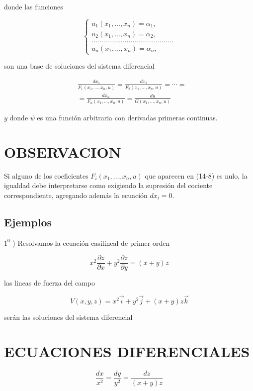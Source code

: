 \documentclass[10pt]{article}
\theoremstyle{plain}
\theoremstyle{definition}
\theoremstyle{remark}
\begin{document}
donde las funciones


$$
\left\{\begin{array}{l}
u_{1}\left(x_{1}, \ldots, x_{n}\right)=\alpha_{1}, \\
u_{2}\left(x_{1}, \ldots, x_{n}\right)=\alpha_{2}, \\
\ldots \ldots \ldots \ldots \ldots \ldots \ldots \ldots \ldots \ldots \ldots \ldots \ldots \ldots \\
u_{n}\left(x_{1}, \ldots, x_{n}\right)=\alpha_{n},
\end{array}\right.
$$

son una base de soluciones del sistema diferencial


\begin{align*}
& \frac{d x_{1}}{F_{1}\left(x_{1}, \ldots, x_{n}, u\right)}=\frac{d x_{2}}{F_{2}\left(x_{1}, \ldots, x_{n}, u\right)}=\cdots= \\
& =\frac{d x_{n}}{F_{n}\left(x_{1}, \ldots, x_{n}, u\right)}=\frac{d u}{G\left(x_{1}, \ldots, x_{n}, u\right)} \tag{14-8}
\end{align*}


$y$ donde $\psi$ es una función arbitraria con derivadas primeras continuas.

\section*{OBSERVACION}
Si alguno de los coeficientes $F_{i}\left(x_{1}, \ldots, x_{n}, u\right)$ que aparecen en (14-8) es nulo, la igualdad debe interpretarse como exigiendo la supresión del cociente correspondiente, agregando además la ecuación $d x_{i}=0$.

\subsection*{Ejemplos}
$1^{0}$ ) Resolvamos la ecuación casilineal de primer orden


\begin{equation*}
x^{2} \frac{\partial z}{\partial x}+y^{2} \frac{\partial z}{\partial y}=(x+y) z \tag{14-9}
\end{equation*}


las lineas de fuerza del campo

$$
V(x, y, z)=x^{2} \vec{i}+y^{2} \vec{j}+(x+y) z \vec{k}
$$

serán las soluciones del sistema diferencial

\section*{ECUACIONES DIFERENCIALES}
$$
\frac{d x}{x^{2}}=\frac{d y}{y^{2}}=\frac{d z}{(x+y) z}
$$
\end{document}
